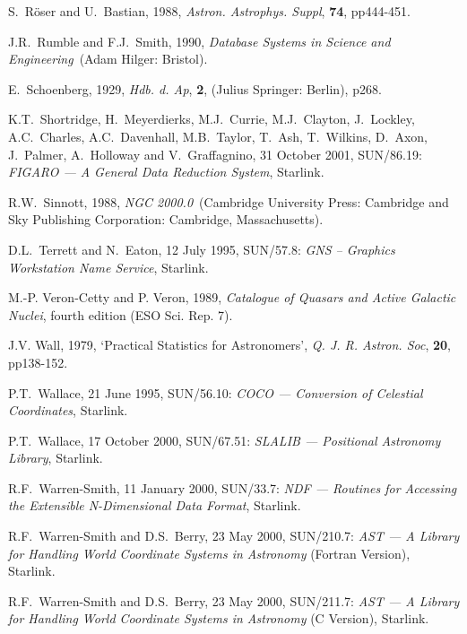\documentclass[twoside,11pt]{article}
\newcommand{\xref}[3]{#1}
\renewcommand{\_}{\texttt{\symbol{95}}}
\begin{document}
\begin{thebibliography}{99}
   S.~R\"{o}ser and U.~Bastian, 1988, {\it Astron.
   Astrophys. Suppl}, {\bf 74}, pp444-451.

   J.R.~Rumble and F.J.~Smith, 1990, {\it Database
   Systems in Science and Engineering}\, (Adam Hilger: Bristol).

   E.~Schoenberg, 1929, {\it Hdb. d. Ap}, {\bf 2},
   (Julius Springer: Berlin), p268.

   K.T.~Shortridge, H.~Meyerdierks, M.J.~Currie,
   M.J.~Clayton, J.~Lockley, A.C.~Charles, A.C.~Davenhall, M.B.~Taylor,
   T.~Ash, T.~Wilkins, D.~Axon, J.~Palmer, A.~Holloway and V.~Graffagnino,
   31 October 2001, \xref{SUN/86.19}{sun86}{}: {\it FIGARO --- A General
   Data Reduction System}, Starlink.

   R.W.~Sinnott, 1988, {\it NGC 2000.0}\, (Cambridge
   University Press: Cambridge and Sky Publishing Corporation: Cambridge,
   Massachusetts).

   D.L.~Terrett and N.~Eaton, 12 July 1995,
   \xref{SUN/57.8}{sun57}{}: {\it GNS -- Graphics Workstation Name Service},
   Starlink.

   M.-P. Veron-Cetty and P. Veron, 1989, {\it Catalogue
   of Quasars and Active Galactic Nuclei}, fourth edition (ESO Sci. Rep. 7).

   J.V. Wall, 1979, `Practical Statistics for
   Astronomers', {\it Q. J. R. Astron. Soc}, {\bf 20},
   pp138-152.

   P.T.~Wallace, 21 June 1995, \xref{SUN/56.10}{sun56}{}:
   {\it COCO --- Conversion of Celestial Coordinates}, Starlink.

   P.T.~Wallace, 17 October 2000, \xref{SUN/67.51}{sun67}{}:
   {\it SLALIB --- Positional Astronomy Library}, Starlink.

   R.F.~Warren-Smith, 11 January 2000,
   \xref{SUN/33.7}{sun33}{}: {\it NDF --- Routines for Accessing the
   Extensible N-Dimensional Data Format}, Starlink.

   R.F.~Warren-Smith and D.S.~Berry, 23 May 2000,
   \xref{SUN/210.7}{sun210}{}: {\it AST --- A Library for Handling World
   Coordinate Systems in Astronomy}\/ (Fortran Version), Starlink.

   R.F.~Warren-Smith and D.S.~Berry, 23 May 2000,
   \xref{SUN/211.7}{sun211}{}: {\it AST --- A Library for Handling World
   Coordinate Systems in Astronomy}\/ (C Version), Starlink.

\end{thebibliography}


\typeout{  }
\typeout{*****************************************************}
\typeout{  }
\typeout{  }
\typeout{*****************************************************}
\typeout{  }
\end{document}
